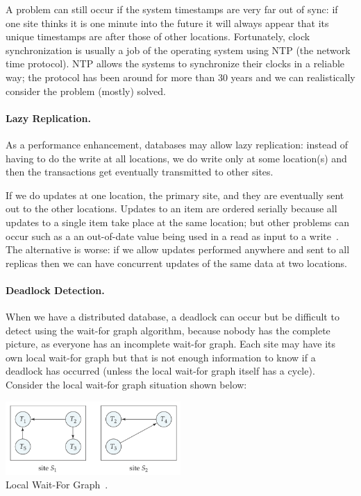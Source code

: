 A problem can still occur if the system timestamps are very far out of sync: if one site thinks it is one minute into the future it will always appear that its unique timestamps are after those of other locations. Fortunately, clock synchronization is usually a job of the operating system using NTP (the network time protocol). NTP allows the systems to synchronize their clocks in a reliable way; the protocol has been around for more than 30 years and we can realistically consider the problem (mostly) solved.

\paragraph{Lazy Replication.} As a performance enhancement, databases may allow lazy replication: instead of having to do the write at all locations, we do write only at some location(s) and then the transactions get eventually transmitted to other sites.

If we do updates at one location, the primary site, and they are eventually sent out to the other locations. Updates to an item are ordered serially because all updates to a single item take place at the same location; but other problems can occur such as a an out-of-date value being used in a read as input to a write~\cite{dsc}. The alternative is worse: if we allow updates performed anywhere and sent to all replicas then we can have concurrent updates of the same data at two locations.

\paragraph{Deadlock Detection.}

When we have a distributed database, a deadlock can occur but be difficult to detect using the wait-for graph algorithm, because nobody has the complete picture, as everyone has an incomplete wait-for graph. Each site may have its own local wait-for graph but that is not enough information to know if a deadlock has occurred (unless the local wait-for graph itself has a cycle). Consider the local wait-for graph situation shown below:

\begin{center}
\includegraphics[width=0.5\textwidth]{images/waitfor-local}\\
Local Wait-For Graph~\cite{dsc}.
\end{center}

